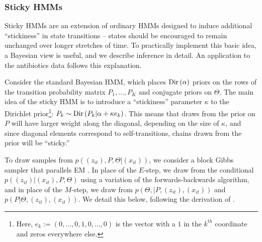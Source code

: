 \documentclass[14pt]{extarticle}
\begin{document}
\subsubsection{Sticky HMMs}
\label{sec:sticky_hmms}

Sticky HMMs are an extension of ordinary HMMs designed to induce additional
``stickiness'' in state transitions -- states should be encouraged to remain
unchanged over longer stretches of time. To practically implement this basic
idea, a Bayesian view is useful, and we describe inference in detail. An
application to the antibiotics data follows this explanation.

Consider the standard Bayesian HMM, which places $\textnormal{Dir}\left(\alpha\right)$
priors on the rows of the transition probability matrix $P_{1}, \dots, P_{K}$
and conjugate priors on $\Theta$. The main idea of the sticky HMM is to
introduce a ``stickiness'' parameter $\kappa$ to the Dirichlet
prior\footnote{Here, $e_{k} := \left(0, \dots, 0, 1, 0, \dots, 0\right)$ is the
  vector with a $1$ in the $k^{th}$ coordinate and zeros everywhere else.}:
$P_{k} \sim \textnormal{Dir}\left(P_{k} \vert \alpha + \kappa e_{k}\right)$. This means that
draws from the prior on $P$ will have larger weight along the diagonal,
depending on the size of $\kappa$, and since diagonal elements correspond to
self-transitions, chains drawn from the prior will be ``sticky.''

To draw samples from $p\left(\left(z_{it}\right), P, \Theta \vert
\left(x_{it}\right)\right)$, we consider a block Gibbs sampler that parallels EM
\citep{fruhwirth2006finite}. In place of the $E$-step, we draw from the
conditional $p\left(\left(z_{it}\right) \vert \left(x_{it}\right), P,
\Theta\right)$ using a variation of the forwards-backwards algorithm, and in
place of the $M$-step, we draw from $p\left(\Theta, \vert P,
\left(z_{it}\right), \left(x_{it}\right)\right)$ and $p\left(P \vert \Theta,
\left(z_{it}\right), \left(x_{it}\right)\right)$. We detail this below,
following the derivation of \citep{fox2009bayesian}.
\end{document}
